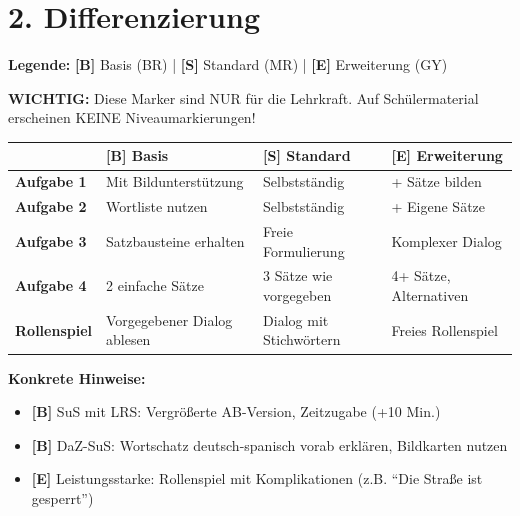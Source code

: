 \documentclass[11pt, a4paper]{article}
\newcommand{\B}{\textcolor{basis}{\textbf{[B]}}}
\newcommand{\Std}{\textcolor{standard}{\textbf{[S]}}}
\newcommand{\E}{\textcolor{erweiterung}{\textbf{[E]}}}
\begin{document}

\section*{2. Differenzierung}

\begin{differenzierung}
\textbf{Legende:} \B{} Basis (BR) | \Std{} Standard (MR) | \E{} Erweiterung (GY)

\vspace{0.5em}

\textbf{WICHTIG:} Diese Marker sind NUR für die Lehrkraft. Auf Schülermaterial erscheinen KEINE Niveaumarkierungen!
\end{differenzierung}

\vspace{1em}

\begin{tabularx}{\textwidth}{|l|X|X|X|}
\hline
& \B{} \textbf{Basis} & \Std{} \textbf{Standard} & \E{} \textbf{Erweiterung} \\
\hline
\textbf{Aufgabe 1} & Mit Bildunterstützung & Selbstständig & + Sätze bilden \\
\hline
\textbf{Aufgabe 2} & Wortliste nutzen & Selbstständig & + Eigene Sätze \\
\hline
\textbf{Aufgabe 3} & Satzbausteine erhalten & Freie Formulierung & Komplexer Dialog \\
\hline
\textbf{Aufgabe 4} & 2 einfache Sätze & 3 Sätze wie vorgegeben & 4+ Sätze, Alternativen \\
\hline
\textbf{Rollenspiel} & Vorgegebener Dialog ablesen & Dialog mit Stichwörtern & Freies Rollenspiel \\
\hline
\end{tabularx}

\vspace{1em}

\textbf{Konkrete Hinweise:}
\begin{itemize}
    \item \B{} SuS mit LRS: Vergrößerte AB-Version, Zeitzugabe (+10 Min.)
    \item \B{} DaZ-SuS: Wortschatz deutsch-spanisch vorab erklären, Bildkarten nutzen
    \item \E{} Leistungsstarke: Rollenspiel mit Komplikationen (z.B. ``Die Straße ist gesperrt'')
\end{itemize}
\end{document}
